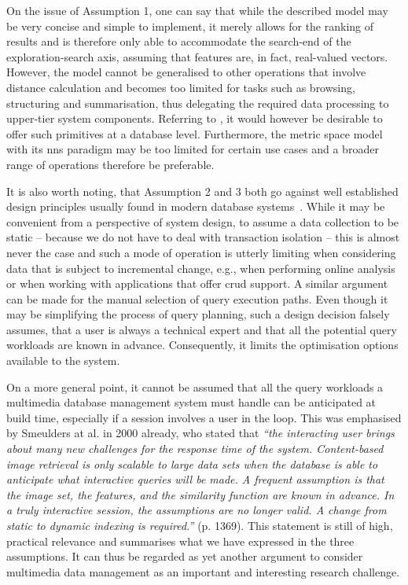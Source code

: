 On the issue of Assumption 1, one can say that while the described model may be very concise and simple to implement, it merely allows for the ranking of results and is therefore only able to accommodate the search-end of the exploration-search axis, assuming that features are, in fact, real-valued vectors. However, the model cannot be generalised to other operations that involve distance calculation and becomes too limited for tasks such as browsing, structuring and summarisation, thus delegating the required data processing to upper-tier system components. Referring to \cite{Jonsson:2016Ten}, it would however be desirable to offer such primitives at a database level. Furthermore, the metric space model with its \acrfull{nns} paradigm may be too limited for certain use cases and a broader range of operations therefore be preferable.

It is also worth noting, that Assumption 2 and 3 both go against well established design principles usually found in modern database systems~\cite{Petrov:2019Database,Amsaleg:2014Database}. While it may be convenient from a perspective of system design, to assume a data collection to be static -- because we do not have to deal with transaction isolation -- this is almost never the case and such a mode of operation is utterly limiting when considering data that is subject to incremental change, e.g., when performing online analysis or when working with applications that offer \acrshort{crud} support. A similar argument can be made for the manual selection of query execution paths. Even though it may be simplifying the process of query planning, such a design decision falsely assumes, that a user is always a technical expert and that all the potential query workloads are known in advance. Consequently, it limits the optimisation options available to the system. 

On a more general point, it cannot be assumed that all the query workloads a multimedia database management system must handle can be anticipated at build time, especially if a session involves a user in the loop. This was emphasised by Smeulders at al. in 2000 already, who stated that \emph{``the interacting user brings about many new challenges for the response time of the system. Content-based image retrieval is only scalable to large data sets when the database is able to anticipate what interactive queries will be made. A frequent assumption is that the image set, the features, and the similarity function are known in advance. In a truly interactive session, the assumptions are no longer valid. A change from static to dynamic indexing is required.''} \cite{Smeulders:2000Content} (p. 1369). This statement is still of high, practical relevance and summarises what we have expressed in the three assumptions. It can thus be regarded as yet another argument to consider multimedia data management as an important and interesting research challenge.

